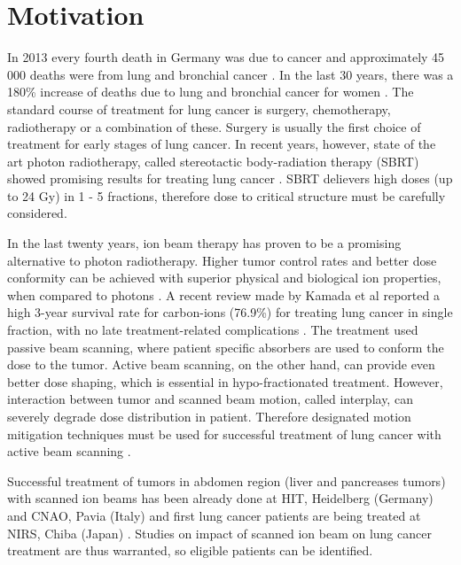  



\section*{Motivation}
In 2013 every fourth death in Germany was due to cancer and approximately 45 000 deaths were from lung and bronchial cancer \cite{Destatis2015}. In the last 30 years, there was a 180\% increase of deaths due to lung and bronchial cancer for women \cite{Destatis2015}.
The standard course of treatment for lung cancer is surgery, chemotherapy, radiotherapy or a combination of these. Surgery is usually the first choice of treatment for early stages of lung cancer. 
In recent years, however, state of the art photon radiotherapy, called stereotactic body-radiation therapy (SBRT) showed
promising results for treating lung cancer \cite{Baumann2009, Greco2011}. SBRT delievers high doses (up to 24 Gy) in 1 - 5 fractions, therefore dose to critical structure must be carefully considered.

In the last twenty years, ion beam therapy has proven to be a promising alternative to photon radiotherapy. Higher tumor control rates and better dose conformity can be achieved with superior physical and biological ion properties, when compared to photons \cite{Tsujii2008,Durante2010}.
A recent review made by Kamada et al reported a high 3-year survival rate for carbon-ions (76.9\%) for treating lung cancer in single fraction, with no late treatment-related complications \cite{Kamada2016}. 
The treatment used passive beam scanning, where patient specific absorbers are used to conform the dose to the tumor. Active beam scanning, on the other hand, can provide even better dose shaping, which is essential in hypo-fractionated treatment. 
However, interaction between tumor and scanned beam motion, called interplay, can severely degrade dose distribution in patient. Therefore designated motion mitigation techniques must be used for successful treatment of lung cancer with active beam scanning \cite{Bert2008}.

Successful treatment of tumors in abdomen region (liver and pancreases tumors) with scanned ion beams has been already done at HIT, Heidelberg (Germany) and CNAO, Pavia (Italy) \cite{Habermehl2013, Rossi2016} and first lung cancer patients are being treated at NIRS, Chiba (Japan) \cite{Mori2016}.
Studies on impact of scanned ion beam on lung cancer treatment are thus warranted, so eligible patients can be identified.

